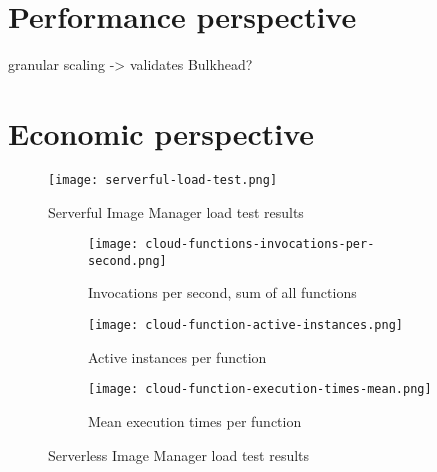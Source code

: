
\section{Performance perspective}

granular scaling -> validates Bulkhead?

\section{Economic perspective}

\begin{figure}[h]
  \centering
  \texttt{[image: serverful-load-test.png]}
  \caption{Serverful Image Manager load test results}
  \label{fig:serverfulLoadTest}
\end{figure}

\begin{figure}
  \centering
  \begin{subfigure}[b]{0.9\textwidth}
      \texttt{[image: cloud-functions-invocations-per-second.png]}
      \caption{Invocations per second, sum of all functions}
      \label{fig:tiger}
  \end{subfigure}

  \begin{subfigure}[b]{0.9\textwidth}
      \texttt{[image: cloud-function-active-instances.png]}
      \caption{Active instances per function}
      \label{fig:gull}
  \end{subfigure}

  \begin{subfigure}[b]{0.9\textwidth}
      \texttt{[image: cloud-function-execution-times-mean.png]}
      \caption{Mean execution times per function}
      \label{fig:mouse}
  \end{subfigure}
  \caption{Serverless Image Manager load test results}\label{fig:serverlessLoadTest}
\end{figure}

